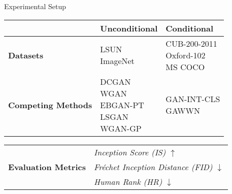 \documentclass{beamer}
\begin{document}
\begin{frame}{Experimental Setup}
    \centering
    \begin{tabular}{|p{}|p{}|p{}|}
        \hline
        & \textbf{Unconditional} & \textbf{Conditional} \\
        \hline
        \multirow{4}{0.15\textwidth}{\textbf{Datasets}} 
            & \multirow{4}{0.25\textwidth}{LSUN \newline ImageNet}
            & \multirow{4}{0.25\textwidth}{CUB-200-2011 \newline Oxford-102 \newline MS COCO} \\
        & & \\
        & & \\
        & & \\
        \hline
        \multirow{6}{0.15\textwidth}{\textbf{Competing Methods}} 
            & \multirow{6}{0.25\textwidth}{DCGAN \newline WGAN \newline EBGAN-PT \newline LSGAN \newline WGAN-GP}
            & \multirow{6}{0.25\textwidth}{GAN-INT-CLS \newline GAWWN} \\
        & & \\
        & & \\
        & & \\
        & & \\
        & & \\
        \hline
    \end{tabular}
    \vspace{1em}

    \centering
    \begin{tabular}{|p{}|p{}|}
        \hline
        \multirow{3}{0.15\textwidth}{\textbf{Evaluation Metrics}} & \textit{Inception Score (IS)}             $\uparrow$ \\\cline{2-2}
                                                                  & \textit{Fréchet Inception Distance (FID)} $\downarrow$ \\\cline{2-2}
                                                                  & \textit{Human Rank (HR)}                  $\downarrow$ \\
        \hline
    \end{tabular}
\end{frame}
\end{document}
